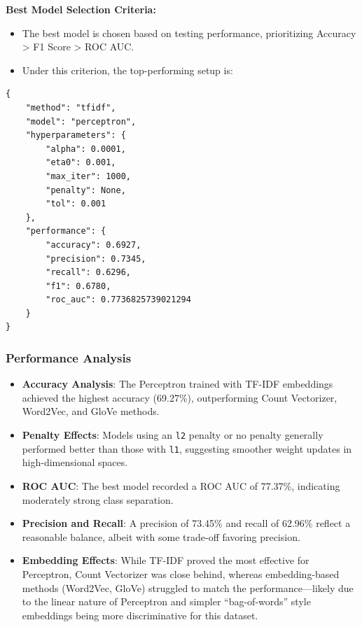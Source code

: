 \textbf{Best Model Selection Criteria:}

\begin{itemize}
    \item The best model is chosen based on testing performance, prioritizing Accuracy > F1 Score > ROC AUC.
    \item Under this criterion, the top-performing setup is:
\end{itemize}

\begin{verbatim}
{
    "method": "tfidf",
    "model": "perceptron",
    "hyperparameters": {
        "alpha": 0.0001,
        "eta0": 0.001,
        "max_iter": 1000,
        "penalty": None,
        "tol": 0.001
    },
    "performance": {
        "accuracy": 0.6927,
        "precision": 0.7345,
        "recall": 0.6296,
        "f1": 0.6780,
        "roc_auc": 0.7736825739021294
    }
}
\end{verbatim}

\subsubsection{Performance Analysis}

\begin{itemize}
    \item \textbf{Accuracy Analysis}: The Perceptron trained with TF-IDF embeddings achieved the highest accuracy (69.27\%), outperforming Count Vectorizer, Word2Vec, and GloVe methods.
    \item \textbf{Penalty Effects}: Models using an \texttt{l2} penalty or no penalty generally performed better than those with \texttt{l1}, suggesting smoother weight updates in high-dimensional spaces.
    \item \textbf{ROC AUC}: The best model recorded a ROC AUC of 77.37\%, indicating moderately strong class separation.
    \item \textbf{Precision and Recall}: A precision of 73.45\% and recall of 62.96\% reflect a reasonable balance, albeit with some trade-off favoring precision.
    \item \textbf{Embedding Effects}: While TF-IDF proved the most effective for Perceptron, Count Vectorizer was close behind, whereas embedding-based methods (Word2Vec, GloVe) struggled to match the performance—likely due to the linear nature of Perceptron and simpler “bag-of-words” style embeddings being more discriminative for this dataset.
\end{itemize}

